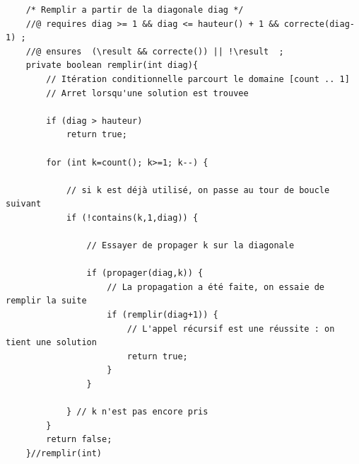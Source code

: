 \documentclass[10pt]{article}\usepackage[correction,nu]{esial}
\begin{document}
\begin{Reponse}
\begin{verbatim}
    /* Remplir a partir de la diagonale diag */
    //@ requires diag >= 1 && diag <= hauteur() + 1 && correcte(diag-1) ;
    //@ ensures  (\result && correcte()) || !\result  ;  
    private boolean remplir(int diag){
        // Itération conditionnelle parcourt le domaine [count .. 1]
        // Arret lorsqu'une solution est trouvee

        if (diag > hauteur) 
            return true;

        for (int k=count(); k>=1; k--) {

            // si k est déjà utilisé, on passe au tour de boucle suivant
            if (!contains(k,1,diag)) {

                // Essayer de propager k sur la diagonale

                if (propager(diag,k)) {
                    // La propagation a été faite, on essaie de remplir la suite
                    if (remplir(diag+1)) {
                        // L'appel récursif est une réussite : on tient une solution
                        return true;
                    }
                }
              
            } // k n'est pas encore pris
        }
        return false;
    }//remplir(int)
\end{verbatim}
\end{Reponse}
\end{document}
